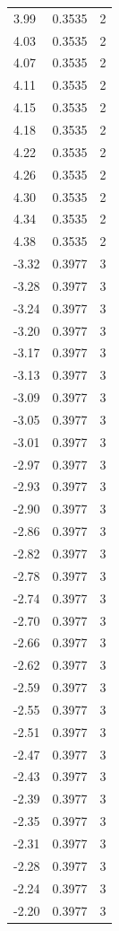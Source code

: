 \begin{longtable}{lrr}
  3.99 & 0.3535 & 2 \\
  4.03 & 0.3535 & 2 \\
  4.07 & 0.3535 & 2 \\
  4.11 & 0.3535 & 2 \\
  4.15 & 0.3535 & 2 \\
  4.18 & 0.3535 & 2 \\
  4.22 & 0.3535 & 2 \\
  4.26 & 0.3535 & 2 \\
  4.30 & 0.3535 & 2 \\
  4.34 & 0.3535 & 2 \\
  4.38 & 0.3535 & 2 \\
  -3.32 & 0.3977 & 3 \\
  -3.28 & 0.3977 & 3 \\
  -3.24 & 0.3977 & 3 \\
  -3.20 & 0.3977 & 3 \\
  -3.17 & 0.3977 & 3 \\
  -3.13 & 0.3977 & 3 \\
  -3.09 & 0.3977 & 3 \\
  -3.05 & 0.3977 & 3 \\
  -3.01 & 0.3977 & 3 \\
  -2.97 & 0.3977 & 3 \\
  -2.93 & 0.3977 & 3 \\
  -2.90 & 0.3977 & 3 \\
  -2.86 & 0.3977 & 3 \\
  -2.82 & 0.3977 & 3 \\
  -2.78 & 0.3977 & 3 \\
  -2.74 & 0.3977 & 3 \\
  -2.70 & 0.3977 & 3 \\
  -2.66 & 0.3977 & 3 \\
  -2.62 & 0.3977 & 3 \\
  -2.59 & 0.3977 & 3 \\
  -2.55 & 0.3977 & 3 \\
  -2.51 & 0.3977 & 3 \\
  -2.47 & 0.3977 & 3 \\
  -2.43 & 0.3977 & 3 \\
  -2.39 & 0.3977 & 3 \\
  -2.35 & 0.3977 & 3 \\
  -2.31 & 0.3977 & 3 \\
  -2.28 & 0.3977 & 3 \\
  -2.24 & 0.3977 & 3 \\
  -2.20 & 0.3977 & 3 \\

\end{longtable}
